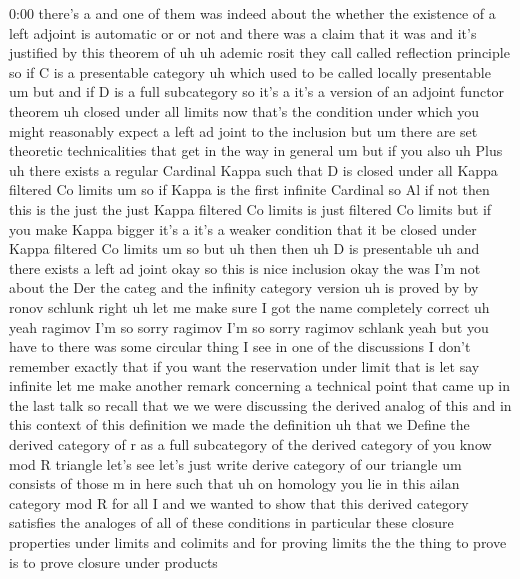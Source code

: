\begin{unfinished}{0:00}
there's  a  and  one  of  them  was  indeed
about  the  whether  the  existence  of  a
left  adjoint  is  automatic  or  or  not  and
there  was  a  claim  that  it  was  and  it's
justified  by  this  theorem  of
uh
uh
ademic
rosit  they  call  called  reflection
principle  so  if  C  is  a  presentable
category  uh  which  used  to  be  called
locally  presentable  um  but
and  if  D  is  a  full
subcategory  so  it's  a  it's  a  version  of
an  adjoint  functor
theorem  uh  closed  under  all
limits  now  that's  the  condition  under
which  you  might  reasonably  expect  a  left
ad  joint  to  the  inclusion  but  um  there
are  set  theoretic  technicalities  that
get  in  the  way  in  general  um  but  if  you
also  uh  Plus
uh  there  exists  a  regular
Cardinal  Kappa  such  that  D  is  closed
under  all  Kappa  filtered  Co
limits  um  so  if  Kappa  is  the  first
infinite  Cardinal  so  Al  if  not  then  this
is  the  just  the  just  Kappa  filtered  Co
limits  is  just  filtered  Co  limits  but  if
you  make  Kappa  bigger  it's  a  it's  a
weaker  condition  that  it  be  closed  under
Kappa  filtered  Co  limits  um  so  but  uh
then  then  uh  D  is
presentable  uh  and  there  exists  a  left
ad
joint  okay  so  this  is  nice  inclusion
okay  the  was  I'm  not  about  the  Der  the
categ
and  the  infinity  category
version  uh  is  proved
by  by
ronov
schlunk  right  uh  let  me  make  sure  I  got
the  name  completely  correct  uh  yeah
ragimov  I'm  so  sorry  ragimov  I'm  so
sorry  ragimov  schlank  yeah  but  you  have
to  there  was  some  circular  thing  I  see
in  one  of  the  discussions  I  don't
remember  exactly  that  if  you  want  the
reservation  under  limit  that  is  let  say
infinite  let  me  make  another  remark
concerning  a  technical  point  that  came
up  in  the  last  talk  so  recall  that  we  we
were  discussing  the  derived  analog  of
this  and  in  this  context  of  this
definition  we  made  the  definition  uh
that  we  Define  the  derived  category  of  r
as  a  full  subcategory  of  the  derived
category  of  you  know  mod  R  triangle
let's  see  let's  just  write  derive
category  of  our
triangle  um  consists  of
those  m  in  here  such  that  uh  on  homology
you  lie  in  this  ailan  category  mod  R  for
all  I  and  we  wanted  to  show  that  this
derived  category  satisfies  the  analoges
of  all  of  these  conditions  in  particular
these  closure  properties  under  limits
and  colimits
and  for  proving  limits  the  the  thing  to
prove  is  to  prove  closure  under  products

\end{unfinished}
